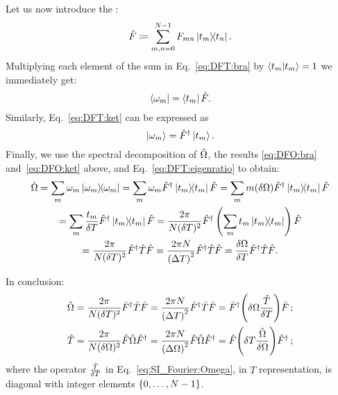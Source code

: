 Let us now introduce the : %
\begin{equation}\label{eq:pw:def_fourier_op}
  \hat{F} \coloneqq \sum_{m,n=0}^{N-1} F_{mn} \ketbra{t_m}{t_n} \text{.}
\end{equation}
Multiplying each element of the sum in Eq.~\eqref{eq:DFT:bra}
by $\braket{t_m} = 1$
we immediately get:
\begin{equation}\label{eq:DFO:bra}
  \bra{\omega_{m}} =
  \bra{t_m} \hat{F} \text{.}
\end{equation}
Similarly, Eq.~\eqref{eq:DFT:ket} can be expressed as
\begin{equation}
  \label{eq:DFO:ket}  \ket{\omega_{m}} = \hat{F}^{\dagger} \ket{t_m} \text{.}
\end{equation}
%
Finally, we use the spectral decomposition of $\hat{\Omega}$,
the results \eqref{eq:DFO:bra} and~\eqref{eq:DFO:ket} above,
and Eq.~\eqref{eq:DFT:eigenratio}
to obtain:
\begin{multline}\label{eq:DFT:OmegaFTF}
  \hat{\Omega} = \sum_{m} \omega_{m} \ketbra{\omega_{m}} =
  \sum_{m} \omega_{m} \hat{F}^{\dagger} \ketbra{t_{m}} \hat{F} =
  \sum_{m} m \qty(\delta\Omega) \hat{F}^{\dagger} \ketbra{t_{m}} \hat{F}
  \\
  = \sum_{m} \frac{t_m}{\delta{T}} \hat{F}^{\dagger} \ketbra{t_{m}} \hat{F}
  = \frac{2\pi}{N(\delta{T})^{2}} \hat{F}^{\dagger} \left(\sum_{m}t_{m}\ketbra{t_{m}}\right) \hat{F}
  \\
  =
  \frac{2\pi}{N(\delta{T})^{2}} \hat{F}^{\dagger} \hat{T} \hat{F} =
  \frac{2\pi N}{\qty(\Delta T)^2} \hat{F}^{\dagger} \hat{T} \hat{F} = \frac{\delta\Omega}{\delta{T}} \hat{F}^{\dagger} \hat{T} \hat{F}
  \text{.}
\end{multline}

In conclusion:
\begin{gather}
  \label{eq:SI_Fourier:Omega}
    \hat{\Omega} =
      \frac{2\pi}{N(\delta T)^2}          \hat{F}^{\dagger} \hat{T} \hat{F} =
      \frac{2\pi N}{\qty(\Delta T)^2}     \hat{F}^{\dagger} \hat{T} \hat{F} =
      \hat{F}^{\dagger} \qty(\delta{\Omega} \frac{\hat{T}}{\delta{T}}) \hat{F}
      \, \text{;}
      \\
  \label{eq:SI_Fourier:T}
    \hat{T} =
      \frac{2\pi}{N(\delta\Omega)^2}      \hat{F} \hat{\Omega} \hat{F}^{\dagger} =
      \frac{2\pi N}{\qty(\Delta\Omega)^2} \hat{F} \hat{\Omega} \hat{F}^{\dagger} =
      \hat{F} \qty(\delta{T} \frac{\hat{\Omega}}{\delta{\Omega}}) \hat{F}^{\dagger}
      \, \text{;}
\end{gather}
where the operator $\frac{\hat{T}}{\delta{T}}$ in Eq.~\eqref{eq:SI_Fourier:Omega},
in $T$ representation, is diagonal with integer elements $\left\{0, \dots, N-1\right\}$.

